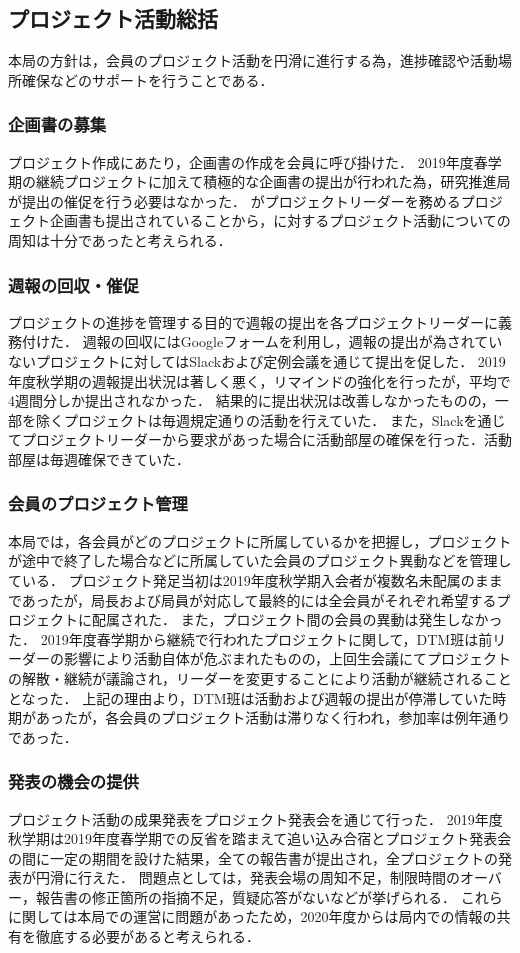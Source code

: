 \subsection*{プロジェクト活動総括}

本局の方針は，会員のプロジェクト活動を円滑に進行する為，進捗確認や活動場所確保などのサポートを行うことである．

\subsubsection*{企画書の募集}
	
プロジェクト作成にあたり，企画書の作成を会員に呼び掛けた．
2019年度春学期の継続プロジェクトに加えて積極的な企画書の提出が行われた為，研究推進局が提出の催促を行う必要はなかった．
\firstGrade{}がプロジェクトリーダーを務めるプロジェクト企画書も提出されていることから，\firstGrade{}に対するプロジェクト活動についての周知は十分であったと考えられる．

\subsubsection*{週報の回収・催促}

プロジェクトの進捗を管理する目的で週報の提出を各プロジェクトリーダーに義務付けた．
週報の回収にはGoogleフォームを利用し，週報の提出が為されていないプロジェクトに対してはSlackおよび定例会議を通じて提出を促した．
2019年度秋学期の週報提出状況は著しく悪く，リマインドの強化を行ったが，平均で4週間分しか提出されなかった．
結果的に提出状況は改善しなかったものの，一部を除くプロジェクトは毎週規定通りの活動を行えていた．
また，Slackを通じてプロジェクトリーダーから要求があった場合に活動部屋の確保を行った．活動部屋は毎週確保できていた．

\subsubsection*{会員のプロジェクト管理}

本局では，各会員がどのプロジェクトに所属しているかを把握し，プロジェクトが途中で終了した場合などに所属していた会員のプロジェクト異動などを管理している．
プロジェクト発足当初は2019年度秋学期入会者が複数名未配属のままであったが，局長および局員が対応して最終的には全会員がそれぞれ希望するプロジェクトに配属された．
また，プロジェクト間の会員の異動は発生しなかった．
2019年度春学期から継続で行われたプロジェクトに関して，DTM班は前リーダーの影響により活動自体が危ぶまれたものの，上回生会議にてプロジェクトの解散・継続が議論され，リーダーを変更することにより活動が継続されることとなった．
上記の理由より，DTM班は活動および週報の提出が停滞していた時期があったが，各会員のプロジェクト活動は滞りなく行われ，参加率は例年通りであった．

\subsubsection*{発表の機会の提供}

プロジェクト活動の成果発表をプロジェクト発表会を通じて行った．
2019年度秋学期は2019年度春学期での反省を踏まえて追い込み合宿とプロジェクト発表会の間に一定の期間を設けた結果，全ての報告書が提出され，全プロジェクトの発表が円滑に行えた．
問題点としては，発表会場の周知不足，制限時間のオーバー，報告書の修正箇所の指摘不足，質疑応答がないなどが挙げられる．
これらに関しては本局での運営に問題があったため，2020年度からは局内での情報の共有を徹底する必要があると考えられる．
